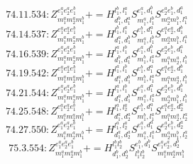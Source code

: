 \documentclass[letterpaper,10pt,fleqn,leqno,onecolumn]{article}
\begin{document}
\begin{equation} \;\;\;\;\;\;  74.11.534: Z^{e_{1}^{a}e_{2}^{a}e_{1}^{b}}_{m_{1}^{a}m_{2}^{a}m_{1}^{b}}+=H^{l_{1}^{b},l_{1}^{a}}_{d_{1}^{b},d_{1}^{a}}S^{e_{1}^{a},d_{1}^{b}}_{m_{1}^{a},l_{1}^{b}}S^{e_{2}^{a}e_{1}^{b},d_{1}^{a}}_{m_{2}^{a}m_{1}^{b},l_{1}^{a}} \end{equation}
\begin{equation} \;\;\;\;\;\;  74.14.537: Z^{e_{1}^{a}e_{2}^{a}e_{1}^{b}}_{m_{1}^{a}m_{2}^{a}m_{1}^{b}}+=H^{l_{1}^{b},l_{1}^{a}}_{d_{1}^{a},d_{1}^{b}}S^{e_{1}^{b},d_{1}^{a}}_{m_{1}^{a},l_{1}^{b}}S^{e_{1}^{a}e_{2}^{a},d_{1}^{b}}_{m_{2}^{a}m_{1}^{b},l_{1}^{a}} \end{equation}
\begin{equation} \;\;\;\;\;\;  74.16.539: Z^{e_{1}^{a}e_{2}^{a}e_{1}^{b}}_{m_{1}^{a}m_{2}^{a}m_{1}^{b}}+=H^{l_{1}^{a},l_{1}^{b}}_{d_{1}^{b},d_{1}^{a}}S^{e_{1}^{a},d_{1}^{b}}_{m_{1}^{b},l_{1}^{a}}S^{e_{2}^{a}e_{1}^{b},d_{1}^{a}}_{m_{1}^{a}m_{2}^{a},l_{1}^{b}} \end{equation}
\begin{equation} \;\;\;\;\;\;  74.19.542: Z^{e_{1}^{a}e_{2}^{a}e_{1}^{b}}_{m_{1}^{a}m_{2}^{a}m_{1}^{b}}+=H^{l_{1}^{a},l_{1}^{b}}_{d_{1}^{a},d_{1}^{b}}S^{e_{1}^{b},d_{1}^{a}}_{m_{1}^{b},l_{1}^{a}}S^{e_{1}^{a}e_{2}^{a},d_{1}^{b}}_{m_{1}^{a}m_{2}^{a},l_{1}^{b}} \end{equation}
\begin{equation} \;\;\;\;\;\;  74.21.544: Z^{e_{1}^{a}e_{2}^{a}e_{1}^{b}}_{m_{1}^{a}m_{2}^{a}m_{1}^{b}}+=H^{l_{1}^{a},l_{1}^{b}}_{d_{1}^{a},d_{1}^{b}}S^{e_{1}^{a},d_{1}^{a}}_{m_{1}^{a},l_{1}^{a}}S^{e_{2}^{a}e_{1}^{b},d_{1}^{b}}_{m_{2}^{a}m_{1}^{b},l_{1}^{b}} \end{equation}
\begin{equation} \;\;\;\;\;\;  74.25.548: Z^{e_{1}^{a}e_{2}^{a}e_{1}^{b}}_{m_{1}^{a}m_{2}^{a}m_{1}^{b}}+=H^{l_{1}^{a},l_{2}^{a}}_{d_{1}^{a},d_{2}^{a}}S^{e_{1}^{b},d_{1}^{a}}_{m_{1}^{b},l_{1}^{a}}S^{e_{1}^{a}e_{2}^{a},d_{2}^{a}}_{m_{1}^{a}m_{2}^{a},l_{2}^{a}} \end{equation}
\begin{equation} \;\;\;\;\;\;  74.27.550: Z^{e_{1}^{a}e_{2}^{a}e_{1}^{b}}_{m_{1}^{a}m_{2}^{a}m_{1}^{b}}+=H^{l_{1}^{a},l_{2}^{a}}_{d_{1}^{a},d_{2}^{a}}S^{e_{1}^{a},d_{1}^{a}}_{m_{1}^{a},l_{1}^{a}}S^{e_{2}^{a}e_{1}^{b},d_{2}^{a}}_{m_{2}^{a}m_{1}^{b},l_{2}^{a}} \end{equation}
\begin{equation} \;\;\;\;\;\;  75.3.554: Z^{e_{1}^{a}e_{2}^{a}e_{1}^{b}}_{m_{1}^{a}m_{2}^{a}m_{1}^{b}}+=H^{l_{1}^{b}l_{2}^{b}}_{d_{1}^{b},d_{2}^{b}}S^{e_{1}^{b},d_{1}^{b}}_{l_{1}^{b}l_{2}^{b}}S^{e_{1}^{a}e_{2}^{a},d_{2}^{b}}_{m_{1}^{a}m_{2}^{a}m_{1}^{b}} \end{equation}
\end{document}
